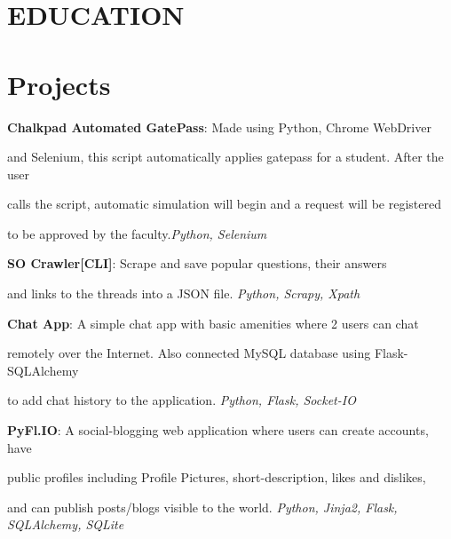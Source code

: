 \documentclass{ss_resume}
\date{\displaydate{date}}
\begin{document}
\makecvtitle


\section{EDUCATION}


\section{Projects}

\medskip

\textbf{Chalkpad Automated GatePass}: Made using Python, Chrome WebDriver

and Selenium, this script automatically applies gatepass for a student. After the user

calls the script, automatic simulation will begin and a request will be registered

to be approved by the faculty.\hfill \textit{Python, Selenium}

\medskip

\textbf{SO Crawler[CLI]}: Scrape and save popular questions, their answers

and links to the threads into a JSON file. \hfill \textit{Python, Scrapy, Xpath}

\medskip

\textbf{Chat App}: A simple chat app with basic amenities where 2 users can chat

remotely over the Internet. Also connected MySQL database using Flask-SQLAlchemy

to add chat history to the application. \hfill \textit{Python, Flask, Socket-IO}

\medskip

\textbf{PyFl.IO}: A social-blogging web application where users can create accounts, have

public profiles including Profile Pictures, short-description, likes and dislikes,

and can publish posts/blogs visible to the world. \hfill \textit{Python, Jinja2, Flask, SQLAlchemy, SQLite}
\end{document}
